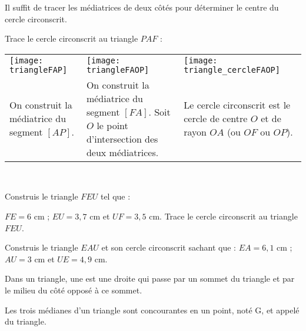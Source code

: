  \begin{methode*1}
 
\begin{remarque}
Il suffit de tracer les médiatrices de deux côtés pour déterminer le centre du cercle circonscrit.
 \end{remarque}
 
 \begin{exemple*1}
Trace le cercle circonscrit au triangle $PAF$ :
 \begin{tabularx}{\textwidth}{X|X|X}
 \texttt{[image: triangleFAP]} &  \texttt{[image: triangleFAOP]} & \texttt{[image: triangle\_cercleFAOP]} \\ 
 On construit la médiatrice du segment $[AP]$. & On construit la médiatrice du segment $[FA]$. Soit $O$ le point d'intersection des deux médiatrices. & Le cercle circonscrit est le cercle de centre $O$ et de rayon $OA$ (ou $OF$ ou $OP$). \\
\end{tabularx} \\

\end{exemple*1}

\exercice
Construis le triangle $FEU$ tel que :

$FE = 6$ cm ; $EU = 3,7$ cm et $UF = 3,5$ cm. Trace le cercle circonscrit au triangle $FEU$.
\vspace{4cm}

\exercice
Construis le triangle $EAU$ et son cercle circonscrit sachant que : $EA = 6,1$ cm ; $AU = 3$ cm et $UE = 4,9$ cm.

\vspace{2cm}

\end{methode*1}

\begin{definition}
Dans un triangle, une  est une droite qui passe par un sommet du triangle et par le milieu du côté opposé à ce sommet.

Les trois médianes d'un triangle sont concourantes en un point, noté G, et appelé  du triangle.
\end{definition}

\vspace{2em}


